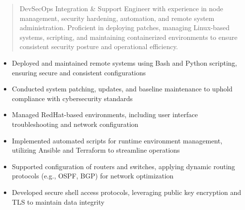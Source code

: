 



\makecvheader

\begin{quote}
  \noindent
  DevSecOps Integration & Support Engineer with experience in node management, security hardening, automation, and remote system administration. Proficient in deploying patches, managing Linux-based systems, scripting, and maintaining containerized environments to ensure consistent security posture and operational efficiency.
\end{quote}

\par\smallskip
\noindent
\begin{minipage}{20cm}
  \begin{minipage}{9.75cm}
    \begin{itemize}
      \item Deployed and maintained remote systems using Bash and Python scripting, ensuring secure and consistent configurations
      \item Conducted system patching, updates, and baseline maintenance to uphold compliance with cybersecurity standards
      \item Managed RedHat-based environments, including user interface troubleshooting and network configuration
    \end{itemize}
  \end{minipage}
  \hfill
  \begin{minipage}{9.75cm}
    \begin{itemize}
      \item Implemented automated scripts for runtime environment management, utilizing Ansible and Terraform to streamline operations
      \item Supported configuration of routers and switches, applying dynamic routing protocols (e.g., OSPF, BGP) for network optimization
      \item Developed secure shell access protocols, leveraging public key encryption and TLS to maintain data integrity
    \end{itemize}
  \end{minipage}
\end{minipage}
\par\smallskip
\divider

